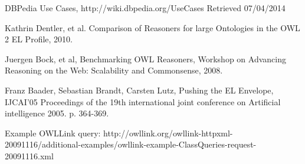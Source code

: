 \documentclass{article}
\begin{document}
\begin{thebibliography}{9}
  DBPedia Use Cases,
  http://wiki.dbpedia.org/UseCases
  Retrieved 07/04/2014

  Kathrin Dentler, et al.
  Comparison of Reasoners for large Ontologies in the OWL 2 EL Profile,
  2010.

  Juergen Bock, et al,
  Benchmarking OWL Reasoners,
  Workshop on Advancing Reasoning on the Web: Scalability and Commonsense,
  2008.

  Franz Baader, Sebastian Brandt, Carsten Lutz,
  Pushing the EL Envelope,
  IJCAI'05 Proceedings of the 19th international joint conference on Artificial intelligence
  2005. p. 364-369.

Example OWLLink query:
http://owllink.org/owllink-httpxml-20091116/additional-examples/owllink-example-ClassQueries-request-20091116.xml

\end{thebibliography}
\end{document}
